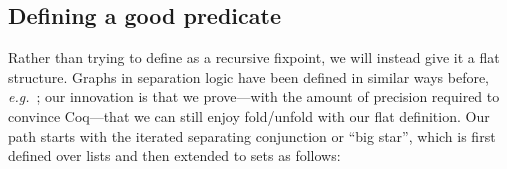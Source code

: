 

%



\subsection{Defining a good  predicate}\label{sec:goodgraph}

Rather than trying to define  as a recursive fixpoint,
we will instead give it a flat structure.  Graphs in separation
logic have been defined in similar ways before, \emph{e.g.}~\cite{ilya-graphs};
our innovation is that we prove---with the amount of precision
required to convince Coq---that we can still enjoy fold/unfold
with our flat definition.  Our path starts with the iterated
separating conjunction or ``big star'', which is first defined over
lists and then extended to sets as follows:

